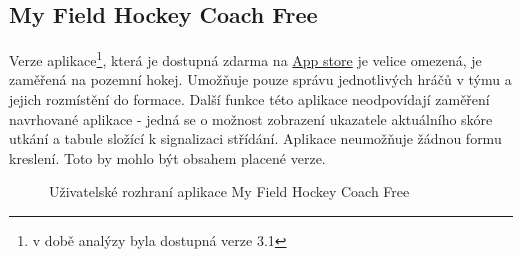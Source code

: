 \documentclass[thesis=B,czech]{FITthesis}[2012/06/26]
\begin{document}
	\subsection{My Field Hockey Coach Free}

	Verze aplikace\footnote{v době analýzy byla dostupná verze 3.1}, která je dostupná zdarma na \href{https://itunes.apple.com/us/app/my-field-hockey-coach-free/id457826679?mt=8}{App store} je velice omezená, je zaměřená na pozemní hokej. Umožňuje pouze správu jednotlivých hráčů v týmu a jejich rozmístění do formace. Další funkce této aplikace neodpovídají zaměření navrhované aplikace \-- jedná se o možnost zobrazení ukazatele aktuálního skóre utkání a tabule složící k signalizaci střídání. Aplikace neumožňuje žádnou formu kreslení. Toto by mohlo být obsahem placené verze.

	\begin{figure}[h!]
		\centering
 		\hfil

 		\caption{Uživatelské rozhraní aplikace My Field Hockey Coach Free}
 		\label{pic:my_field_hockey_coach_free}
	\end{figure}
\end{document}
